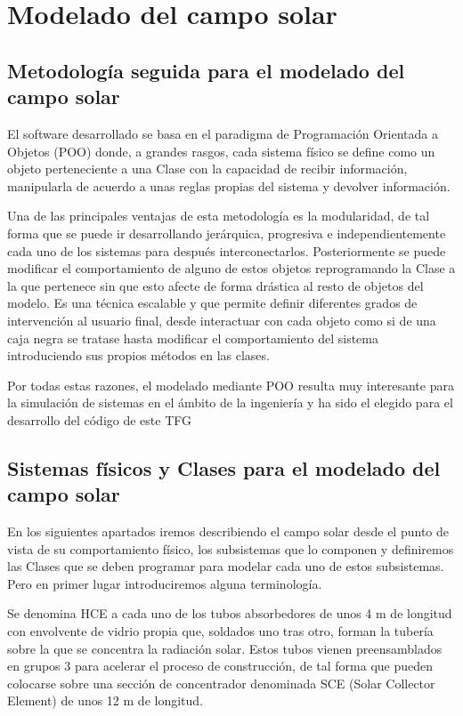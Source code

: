 \chapter{Modelado del campo solar}
\label{modeladodelcamposolar}

\section{Metodología seguida para el modelado del campo solar}

El software desarrollado se basa en el paradigma de Programación Orientada a Objetos (POO) donde, a grandes rasgos, cada sistema físico se define como un objeto perteneciente a una Clase con la capacidad de recibir información, manipularla de acuerdo a unas reglas propias del sistema y devolver información.

Una de las principales ventajas de esta metodología es la modularidad, de tal forma que se puede ir desarrollando jerárquica, progresiva e independientemente cada uno de los sistemas para después interconectarlos. Posteriormente se puede modificar el comportamiento de alguno de estos objetos reprogramando la Clase a la que pertenece sin que esto afecte de forma drástica al resto de objetos del modelo. Es una técnica escalable y que permite definir diferentes grados de
intervención al usuario final, desde interactuar con cada objeto como si de una caja negra se tratase hasta modificar el comportamiento del sistema introduciendo sus propios métodos en las clases.

Por todas estas razones, el modelado mediante POO resulta muy interesante para la simulación de sistemas en el ámbito de la ingeniería y ha sido el elegido para el desarrollo del código de este TFG 

\section{Sistemas físicos y Clases para el modelado del campo solar}

En los siguientes apartados iremos describiendo el campo solar desde el punto de vista de su comportamiento físico, los subsistemas que lo componen y definiremos las Clases que se deben programar para modelar cada uno de estos subsistemas. Pero en primer lugar introduciremos alguna terminología.

Se denomina HCE a cada uno de los tubos absorbedores de unos 4 m de longitud con envolvente de vidrio propia que, soldados uno tras otro, forman la tubería sobre la que se concentra la radiación solar. Estos tubos vienen preensamblados en grupos 3 para acelerar el proceso de construcción, de tal forma que pueden colocarse sobre una sección de concentrador denominada SCE (Solar Collector Element) de unos 12 m de longitud.

